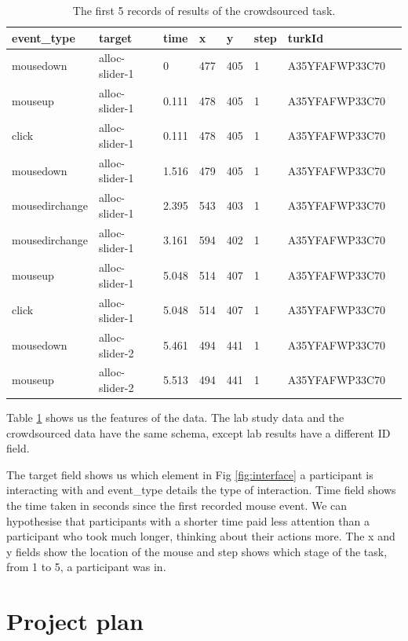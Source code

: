 \documentclass{article}
\begin{document}
\begin{table}[ht]
    \caption{\label{table:data} The first 5 records of results of the crowdsourced task.}

    \begin{tabular}{llllllll}
        \hline
        event\_type    & target         & time  & x   & y   & step & turkId         \\ \hline
        mousedown      & alloc-slider-1 & 0     & 477 & 405 & 1    & A35YFAFWP33C70 \\
        mouseup        & alloc-slider-1 & 0.111 & 478 & 405 & 1    & A35YFAFWP33C70 \\
        click          & alloc-slider-1 & 0.111 & 478 & 405 & 1    & A35YFAFWP33C70 \\
        mousedown      & alloc-slider-1 & 1.516 & 479 & 405 & 1    & A35YFAFWP33C70 \\
        mousedirchange & alloc-slider-1 & 2.395 & 543 & 403 & 1    & A35YFAFWP33C70 \\
        mousedirchange & alloc-slider-1 & 3.161 & 594 & 402 & 1    & A35YFAFWP33C70 \\
        mouseup        & alloc-slider-1 & 5.048 & 514 & 407 & 1    & A35YFAFWP33C70 \\
        click          & alloc-slider-1 & 5.048 & 514 & 407 & 1    & A35YFAFWP33C70 \\
        mousedown      & alloc-slider-2 & 5.461 & 494 & 441 & 1    & A35YFAFWP33C70 \\
        mouseup        & alloc-slider-2 & 5.513 & 494 & 441 & 1    & A35YFAFWP33C70 \\ \hline
    \end{tabular}
\end{table}

Table \ref{table:data} shows us the features of the data.
The lab study data and the crowdsourced data have the same schema, except lab results have a different ID field.

The target field shows us which element in Fig \ref{fig:interface} a participant is interacting with and event\_type details the type of interaction.
Time field shows the time taken in seconds since the first recorded mouse event.
We can hypothesise that participants with a shorter time paid less attention than a participant who took much longer, thinking about their actions more.
The x and y fields show the location of the mouse and step shows which stage of the task, from 1 to 5, a participant was in.


\section{Project plan}
% 
\end{document}
